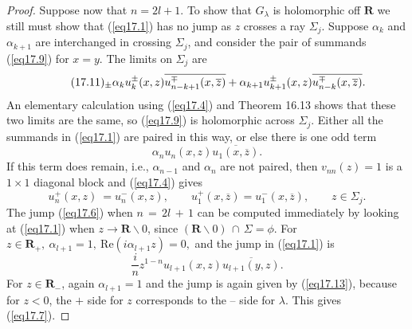 \documentclass{surv-l}
\theoremstyle{plain}
\theoremstyle{definition}
\numberwithin{equation}{chapter}
\begin{document}
\begin{proof}
Suppose now that $n=2l+1$. To show that $G_{\lambda}$ is holomorphic off $\mathbf{R}$ we still must show that (\ref{eq17.1}) has no jump as $z$ crosses a ray $\Sigma_{j}$. Suppose $\alpha_{k}$ and $\alpha_{k+1}$ are interchanged in crossing $\Sigma_{j}$, and consider the pair of summands (\ref{eq17.9}) for $x=y$. The limits on $\Sigma_{j}$ are
\begin{equation*}
\tag*{$(17.11)_{\pm}$}\alpha_{k}u_{k}^{\pm}(x,z)\overline{u_{n-k+1}^{\mp}(x, \overline{z})}+\alpha_{k+1}u_{k+1}^{\pm}(x,z)\overline{u_{n-k}^{\mp}(x, \overline{z})}.
\end{equation*}
An elementary calculation using (\ref{eq17.4}) and Theorem 16.13 shows that these two limits are the same, so (\ref{eq17.9}) is holomorphic across $\Sigma_{j}$. Either all the summands in (\ref{eq17.1}) are paired in this way, or else there is one odd term
\setcounter{equation}{11}
\begin{equation}\label{eq17.12}
\alpha_{n}u_{n}(x,z)\overline{u_{1}(x,\overline{z})}.
\end{equation}
If this term does remain, i.e., $\alpha_{n-1}$ and $\alpha_{n}$ are not paired, then $v_{nn}(z)=1$ is a $1\times 1$ diagonal block and (\ref{eq17.4}) gives
\begin{equation*}
u_{n}^{+}(x,z)\ =u_{n}^{-}(x, z),\qquad u_{1}^{+}(x,\overline{z})=u_{1}^{-}(x,\overline{z}),\qquad z\in\Sigma_{j}.
\end{equation*}
The jump (\ref{eq17.6}) when $n\,=\,2l\,+\,1$ can be computed immediately by looking at (\ref{eq17.1}) when $z\rightarrow \mathbf{R}\backslash 0$, since $(\mathbf{R}\backslash 0)\,\cap\,\Sigma=\phi$. For $z\in \mathbf{R}_{+},\ \alpha_{l+1}=1,\ \mathrm{Re}(i\alpha_{l+1}z)=0,$ and the jump in (\ref{eq17.1}) is
\begin{equation}\label{eq17.13}
\displaystyle \frac{i}{n}z^{1-n}u_{l+1}(x,z)\overline{u_{l+1}(y,z)}.
\end{equation}
For $z\in \mathbf{R}_{-}$, again $\alpha_{l+1}=1$ and the jump is again given by (\ref{eq17.13}), because for $z<0$, the $+$ side for $z$ corresponds to the -- side for $\lambda$. This gives (\ref{eq17.7}).


\end{proof}
\end{document}
